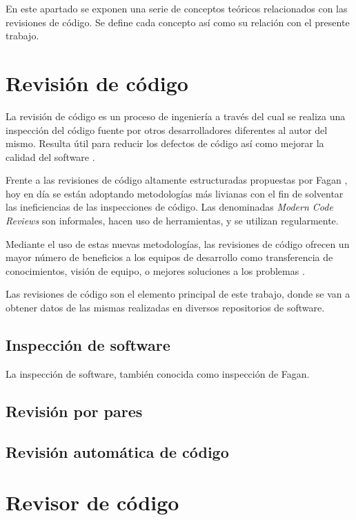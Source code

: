 
En este apartado se exponen una serie de conceptos teóricos relacionados con las revisiones de código. Se define cada concepto así como su relación con el presente trabajo.

\section{Revisión de código}
La revisión de código es un proceso de ingeniería a través del cual se realiza una inspección del código fuente por otros desarrolladores diferentes al autor del mismo. Resulta útil para reducir los defectos de código así como mejorar la calidad del software \cite{28121}.

Frente a las revisiones de código altamente estructuradas propuestas por Fagan \cite{5388086}, hoy en día se están adoptando metodologías más livianas con el fin de solventar las ineficiencias de las inspecciones de código. Las denominadas \emph{Modern Code Reviews} son informales, hacen uso de herramientas, y se utilizan regularmente.

Mediante el uso de estas nuevas metodologías, las revisiones de código ofrecen un mayor número de beneficios a los equipos de desarrollo como transferencia de conocimientos, visión de equipo, o mejores soluciones a los problemas \cite{Bacchelli:2013:EOC:2486788.2486882}.

Las revisiones de código son el elemento principal de este trabajo, donde se van a obtener datos de las mismas realizadas en diversos repositorios de software.

\subsection{Inspección de software}
La inspección de software, también conocida como inspección de Fagan.


\subsection{Revisión por pares}

\subsection{Revisión automática de código}

\section{Revisor de código}

